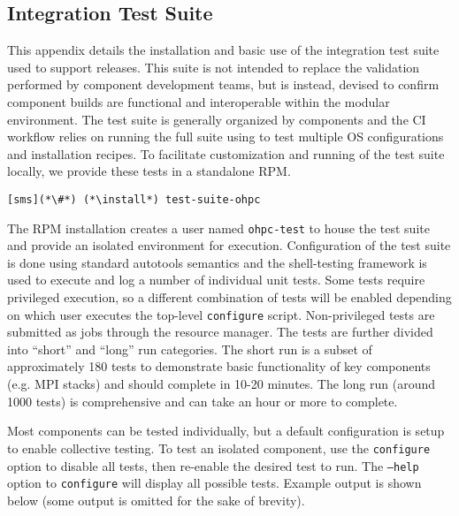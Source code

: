 \subsection{Integration Test Suite}  \label{appendix:test_suite}

This appendix details the installation and basic use of the integration test
suite used to support \OHPC{} releases. This suite is not intended to replace
the validation performed by component development teams, but is instead,
devised to confirm component builds are functional and interoperable within
the modular \OHPC{} environment.
The test suite is generally organized by components and the \OHPC{} CI workflow
relies on running the full suite using \href{https://jenkins.io}{\color{blue}{Jenkins}} to test
multiple OS configurations and installation recipes.
To facilitate customization and running of the test suite locally, we 
provide these tests in a standalone RPM. 

\begin{lstlisting}
[sms](*\#*) (*\install*) test-suite-ohpc
\end{lstlisting}

The RPM installation creates a user named \texttt{ohpc-test} to house the test
suite and provide an isolated environment for execution.
Configuration of the test suite is done using standard \GNU{} 
autotools semantics and the
\href{https://jenkins.io}{\color{blue}{BATS}} shell-testing framework is used to execute and log a number of individual
unit tests. 
Some tests require privileged execution, so a different combination of tests will be
enabled depending on which user executes the top-level \texttt{configure} script. Non-privileged
tests are submitted as jobs through the \rms{} resource manager. The tests are
further divided into ``short'' and ``long'' run categories. The short run is a subset
of approximately 180 tests to demonstrate basic functionality of key components
(e.g. MPI stacks) and should 
complete in 10-20 minutes. The long run (around 1000 tests) is comprehensive
and can take an hour or more to complete. 

Most components can be tested individually, but a default configuration is
setup to enable collective testing. To test an isolated component, use the
\texttt{configure} option to disable all tests, then re-enable the desired test
to run. The \texttt{--help} option to \texttt{configure} will display all
possible tests. Example output is shown below (some output is omitted for the
sake of brevity).


